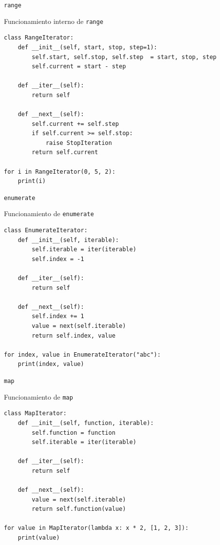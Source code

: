 \documentclass[12pt]{beamer}
\begin{document}
\begin{frame}[fragile]{\texttt{range}}
\begin{block}{Funcionamiento interno de \texttt{range}}
\begin{verbatim}
class RangeIterator:
    def __init__(self, start, stop, step=1):
        self.start, self.stop, self.step  = start, stop, step
        self.current = start - step

    def __iter__(self):
        return self

    def __next__(self):
        self.current += self.step
        if self.current >= self.stop:
            raise StopIteration
        return self.current

for i in RangeIterator(0, 5, 2):
    print(i)
\end{verbatim}
\end{block}  
\end{frame}

\begin{frame}[fragile]{\texttt{enumerate}}
\begin{block}{Funcionamiento de \texttt{enumerate}}
\begin{verbatim}
class EnumerateIterator:
    def __init__(self, iterable):
        self.iterable = iter(iterable)
        self.index = -1

    def __iter__(self):
        return self

    def __next__(self):
        self.index += 1
        value = next(self.iterable)
        return self.index, value

for index, value in EnumerateIterator("abc"):
    print(index, value)
\end{verbatim}
\end{block}  
\end{frame}

\begin{frame}[fragile]{\texttt{map}}
\begin{block}{Funcionamiento de \texttt{map}}
\begin{verbatim}
class MapIterator:
    def __init__(self, function, iterable):
        self.function = function
        self.iterable = iter(iterable)

    def __iter__(self):
        return self

    def __next__(self):
        value = next(self.iterable)
        return self.function(value)

for value in MapIterator(lambda x: x * 2, [1, 2, 3]):
    print(value)
\end{verbatim}
\end{block}  
\end{frame}
\end{document}
